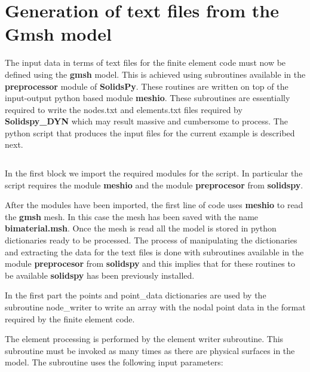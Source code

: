 \documentclass[11pt,letterpaper]{article}
\begin{document}
\section{Generation of text files from the Gmsh model}
\label{meshio}
The input data in terms of text files for the finite element code must now be defined using the {\bf gmsh} model. This is achieved using subroutines available in the {\bf preprocessor} module of {\bf SolidsPy}. These routines are written on top of the input-output python based module {\bf meshio}. These subroutines are essentially required to write the nodes.txt and elements.txt files required by {\bf Solidspy\_DYN} which may result massive and cumbersome to process. The python script that produces the input files for the current example is described next.


\inputminted[mathescape,
               numbersep=5pt,
               gobble=0,
               frame=lines,
               framesep=2mm]{c}{bimaterial.py}


In the first block we import the required modules for the script. In particular the script requires the module {\bf meshio} and the module {\bf preprocesor} from {\bf solidspy}.

After the modules have been imported, the first line of code uses {\bf meshio} to read the {\bf gmsh} mesh. In this case the mesh has been saved with the name {\bf bimaterial.msh}. Once the mesh is read all the model is stored in python dictionaries ready to be processed. The process of manipulating the dictionaries and extracting the data for the text files is done with subroutines available in the module  {\bf preprocesor} from {\bf solidspy} and this implies that for these routines to be available {\bf solidspy} has been previously installed.

In the first part the points and point\_data dictionaries are used by the subroutine node\_writer to write an array with the nodal point data in the format required by the finite element code.

The element processing is performed by the element writer subroutine. This subroutine must be invoked as many times as there are physical surfaces in the model. The subroutine uses the following input parameters:
\end{document}
